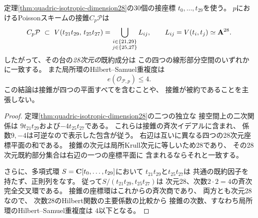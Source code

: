 \begin{corollary}[接錐の最大次元成分の四候補と重複度上界]
\label{cor:isotropic-four-tangent-planes}
定理\ref{thm:quadric-isotropic-dimension28}の30個の接座標
\(t_0,\ldots,t_{29}\)を使う。
\(p\)におけるPoissonスキームの接錐\(C_p\mathcal P\)は
\[
 C_p\mathcal P\ \subset\
 V(t_{21}t_{29},\,t_{25}t_{27})
 =
 \bigcup_{\substack{i\in\{21,29\}\\j\in\{25,27\}}}
 L_{ij},\qquad
 L_{ij}=V(t_i,t_j)\simeq\AA^{28}.
\]
したがって、その台の\emph{28次元の}既約成分は
この四つの線形部分空間のいずれかに一致する。
また局所環のHilbert--Samuel重複度は
\[
 \boxed{\quad e(\mathcal O_{\mathcal P,p})\le4.\quad}
\]
この結論は接錐が四つの平面すべてを含むことや、
接錐が被約であることを主張しない。
\end{corollary}
\begin{proof}
定理\ref{thm:quadric-isotropic-dimension28}の二つの独立な
接空間上の二次関係は
\(9t_{21}t_{29}\)および\(-4t_{25}t_{27}\)である。
これらは接錐の斉次イデアルに含まれ、
係数\(9,-4\)は可逆なので表示した包含が従う。
右辺は互いに異なる四つの28次元座標平面の和である。
接錐の次元は局所Krull次元に等しいため28であり、
その28次元既約部分集合は右辺の一つの座標平面に
含まれるならそれと一致する。

さらに、多項式環
\(S=\CC[t_0,\ldots,t_{29}]\)において
\(t_{21}t_{29}\)と\(t_{25}t_{27}\)は
共通の既約因子を持たず、正則列をなす。
従って\(S/(t_{21}t_{29},t_{25}t_{27})\)は
次元28、次数\(2\cdot2=4\)の斉次完全交叉環である。
接錐の座標環はこれからの斉次商であり、
両方とも次元28なので、
次数28のHilbert関数の主要係数の比較から
接錐の次数、すなわち局所環のHilbert--Samuel重複度は
\(4\)以下となる。
\end{proof}

